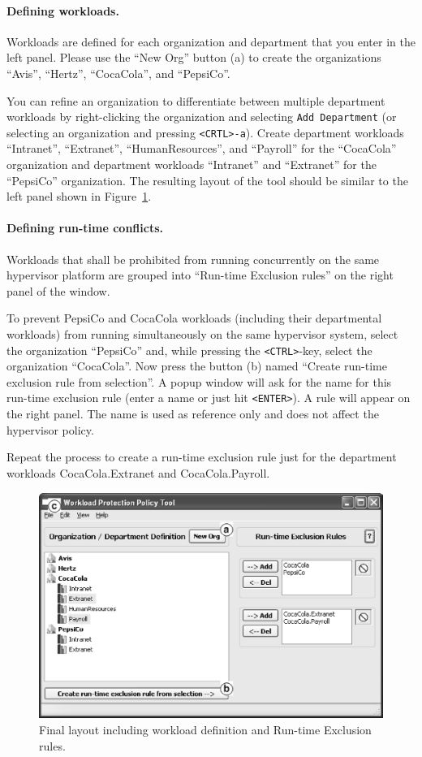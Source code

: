 \documentclass[11pt,twoside,final,openright]{report}
\begin{document}
\paragraph{Defining workloads.} Workloads are defined for each
organization and department that you enter in the left panel. Please
use the ``New Org'' button (a) to create the organizations ``Avis'',
``Hertz'', ``CocaCola'', and ``PepsiCo''.

You can refine an organization to differentiate between multiple
department workloads by right-clicking the organization and selecting
\verb|Add Department| (or selecting an organization and pressing
\verb|<CRTL>-a|). Create department workloads ``Intranet'',
``Extranet'', ``HumanResources'', and ``Payroll'' for the ``CocaCola''
organization and department workloads ``Intranet'' and ``Extranet''
for the ``PepsiCo'' organization. The resulting layout of the tool
should be similar to the left panel shown in
Figure~\ref{fig:acmezpolicy}.

\paragraph{Defining run-time conflicts.} Workloads that shall be
prohibited from running concurrently on the same hypervisor platform
are grouped into ``Run-time Exclusion rules'' on the right panel of
the window.

To prevent PepsiCo and CocaCola workloads (including their
departmental workloads) from running simultaneously on the same
hypervisor system, select the organization ``PepsiCo'' and, while
pressing the \verb|<CTRL>|-key, select the organization ``CocaCola''.
Now press the button (b) named ``Create run-time exclusion rule from
selection''. A popup window will ask for the name for this run-time
exclusion rule (enter a name or just hit \verb|<ENTER>|). A rule will
appear on the right panel. The name is used as reference only and does
not affect the hypervisor policy.

Repeat the process to create a run-time exclusion rule just for the
department workloads CocaCola.Extranet and CocaCola.Payroll.

\begin{figure}[htb]
\centering
\includegraphics[width=13cm]{figs/acm_ezpolicy.eps}
\caption{Final layout including workload definition and Run-time Exclusion rules.}
\label{fig:acmezpolicy}
\end{figure}
\end{document}
